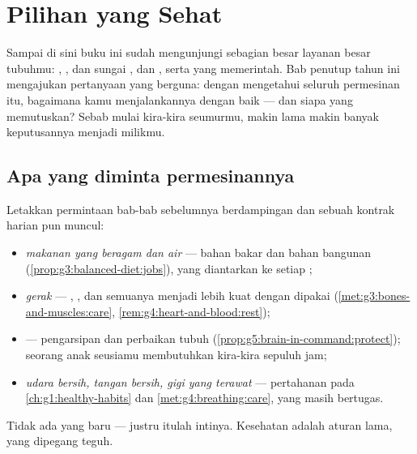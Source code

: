 \chapter{Pilihan yang Sehat}\label{ch:g5:healthy-choices}

Sampai di sini buku ini sudah mengunjungi sebagian besar layanan besar
tubuhmu: , ,  dan sungai ,
 dan , serta  yang memerintah. Bab penutup tahun ini
mengajukan pertanyaan yang berguna: dengan mengetahui seluruh
permesinan itu, bagaimana kamu menjalankannya dengan baik --- dan
siapa yang memutuskan? Sebab mulai kira-kira seumurmu, makin lama
makin banyak keputusannya menjadi milikmu.

\section{Apa yang diminta permesinannya}

\begin{proposition}\label{prop:g5:healthy-choices:contract}
Letakkan permintaan bab-bab sebelumnya berdampingan dan sebuah kontrak
harian pun muncul:
\begin{itemize}
  \item \emph{makanan yang beragam dan air} --- bahan bakar dan bahan
        bangunan (\cref{prop:g3:balanced-diet:jobs}), yang diantarkan
         ke setiap ;
  \item \emph{gerak} --- , ,  dan  semuanya
        menjadi lebih kuat dengan dipakai
        (\cref{met:g3:bones-and-muscles:care},
        \cref{rem:g4:heart-and-blood:rest});
  \item \emph{} --- pengarsipan  dan perbaikan tubuh
        (\cref{prop:g5:brain-in-command:protect}); seorang anak
        seusiamu membutuhkan kira-kira sepuluh jam;
  \item \emph{udara bersih, tangan bersih, gigi yang terawat} ---
        pertahanan pada \cref{ch:g1:healthy-habits} dan
        \cref{met:g4:breathing:care}, yang masih bertugas.
\end{itemize}
Tidak ada yang baru --- justru itulah intinya. Kesehatan adalah aturan
lama, yang dipegang teguh.
\end{proposition}
\admitted

